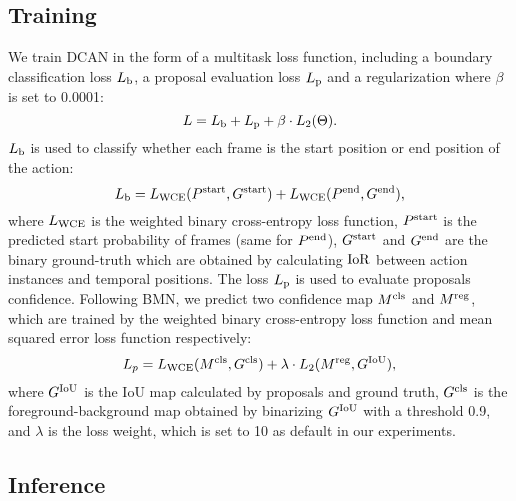 \documentclass[letterpaper]{article} \usepackage{aaai22}  \usepackage{times}  \usepackage{helvet}  \usepackage{courier}  \usepackage[hyphens]{url}  \usepackage{graphicx} \urlstyle{rm} \def\UrlFont{\rm}  \usepackage{natbib}  \usepackage{caption} \DeclareCaptionStyle{ruled}{labelfont=normalfont,labelsep=colon,strut=off} \frenchspacing  \setlength{\pdfpagewidth}{8.5in}  \setlength{\pdfpageheight}{11in}  \usepackage{algorithm}
\begin{document}
\subsection{Training}
We train DCAN in the form of a multitask loss function, including a boundary classification loss  $L_{\rm b}$, a proposal evaluation loss $L_{\rm p}$ and a regularization where $\beta$ is set to 0.0001:
\begin{equation}
L=L_{\rm b}+L_{\rm p}+ \beta \cdot L_2(\Theta).
\end{equation}
$L_{\rm b}$ is used to classify whether each frame is the start position or end position of the action:
\begin{equation}
L_{\rm b}=L_{\rm WCE}(P^{\rm start},G^{\rm start})+L_{\rm WCE}(P^{\rm end},G^{\rm end}),
\end{equation}
where $L_{\rm WCE}$ is the weighted binary cross-entropy loss function, $P^{\rm start}$ is the predicted start probability of frames (same for $P^{\rm end}$), $G^{\rm start}$ and $G^{\rm end}$ are the binary ground-truth which are obtained by calculating ${\rm IoR}$ between action instances and temporal positions. The loss $L_{\rm p}$ is used to evaluate proposals confidence. Following BMN, we predict two confidence map $M^{\rm cls}$ and $M^{\rm reg}$, which are trained by the weighted binary cross-entropy loss function and mean squared error loss function respectively:
\begin{equation}
L_p=L_{\rm WCE}(M^{\rm cls},G^{\rm cls})+\lambda \cdot L_{2}(M^{\rm reg},G^{\rm IoU}),
\end{equation}
where $G^{\rm IoU}$ is the IoU map calculated by proposals and ground truth, $G^{\rm cls}$ is the foreground-background map obtained by binarizing $G^{\rm IoU}$ with a threshold 0.9, and $\lambda$ is the loss weight, which is set to 10 as default in our experiments.



\subsection{Inference}
\end{document}
